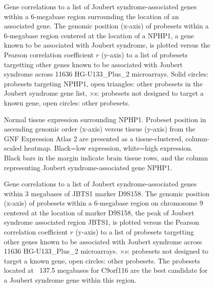 \documentclass{bioinfo}
\begin{document}
\begin{figure}[!tpb]
\label{figure:NPHP1}
\centerline{}
\caption{Gene correlations to a list of Joubert syndrome-associated genes within a
6-megabase region surrounding the location of an associated gene.  The genomic
position (x-axis) of probesets within a 6-megabase region centered at the
location of a NPHP1, a gene known to be associated with Joubert syndrome, is
plotted versus the Pearson correlation coefficient $r$ (y-axis) to a list of
probesets targetting other genes known to be associated with Joubert syndrome
across 11636 HG-U133\_Plus\_2 microarrays.  Solid circles: probesets targeting
NPHP1, open triangles: other probesets in the Joubert syndrome gene list,
$\times$s: probesets not designed to target a known gene, open circles: other
probesets.}
\end{figure}


\begin{figure}[!tpb]
\label{figure:GeneAtlas}
\centerline{}
\caption{Normal tissue expression surrounding NPHP1.  Probeset position in
ascending genomic order (x-axis) versus tissue (y-axis) from the GNF Expression
Atlas 2 are presented as a tissue-clustered, column-scaled heatmap.  Black=low
expression, white=high expression.  Black bars in the margin indicate brain
tissue rows, and the column representing Joubert syndrome-associated gene
NPHP1.}
\end{figure}


\begin{figure}[!tpb]
\label{figure:JBTS1}
\centerline{}
\caption{Gene correlations to a list of Joubert syndrome-associated genes within 3
megabases of JBTS1 marker D9S158.  The genomic position (x-axis) of probesets
within a 6-megabase region on chromosome 9 centered at the location of marker D9S158, the peak
of Joubert syndrome associated region JBTS1, is plotted versus the Pearson
correlation coefficient $r$ (y-axis) to a list of probesets targetting other
genes known to be associated with Joubert syndrome across 11636
HG-U133\_Plus\_2 microarrays.  $\times$s: probesets not designed to target a
known gene, open circles: other probesets.  The probesets located at ~137.5
megabases for C9orf116 are the best candidate for a Joubert syndrome gene
within this region.}
\end{figure}
\end{document}
